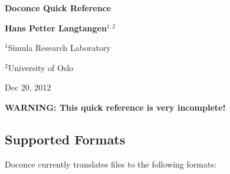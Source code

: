 \documentclass[twoside]{article}
\begin{document}





\begin{center}
{\LARGE\bf Doconce Quick Reference}
\end{center}





\begin{center}
{\bf Hans Petter Langtangen${}^{1, 2}$} \\ [0mm]
\end{center}

\begin{center}
\centerline{{\small ${}^1$Simula Research Laboratory}}
\centerline{{\small ${}^2$University of Oslo}}
\end{center}





\begin{center}
Dec 20, 2012
\end{center}

\vspace{1cm}



\tableofcontents

\vspace{1cm} %






\textbf{WARNING: This quick reference is very incomplete!}

\subsection{Supported Formats}

Doconce currently translates files to the following formats:
\end{document}
